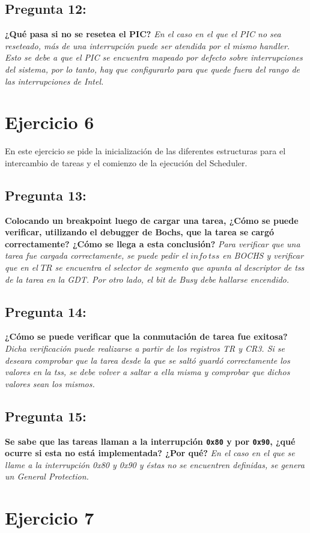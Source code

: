 \documentclass[10pt, a4paper]{article}
\begin{document}
{\subsection{Pregunta 12:}} \textbf{¿Qué pasa si no se resetea el PIC?}\newline
\newline
\textit{En el caso en el que el PIC no sea reseteado, más de una interrupción puede ser atendida por el mismo handler. Esto se debe a que el PIC se encuentra mapeado por defecto sobre interrupciones del sistema, por lo tanto, hay que configurarlo para que quede fuera del rango de las interrupciones de Intel.}

\section{Ejercicio 6}
En este ejercicio se pide la inicialización de las diferentes estructuras para el intercambio de tareas y el comienzo de la ejecución del Scheduler.


{\subsection{Pregunta 13:}} \textbf{Colocando un breakpoint luego de cargar una tarea, ¿Cómo se puede verificar, utilizando el debugger de Bochs, que la tarea se cargó correctamente?
¿Cómo se llega a esta conclusión?}\newline
\newline
\textit{Para verificar que una tarea fue cargada correctamente, se puede pedir el $info\ tss$ en BOCHS y verificar que en el $TR$ se encuentra el selector de segmento que apunta al descriptor de tss de la tarea en la GDT. Por otro lado, el bit de Busy debe hallarse encendido.}

{\subsection{Pregunta 14:}} \textbf{¿Cómo se puede verificar que la conmutación de tarea fue exitosa?}\newline
\newline
\textit{Dicha verificación puede realizarse a partir de los registros TR y CR3. Si se deseara comprobar que la tarea desde la que se saltó guardó correctamente los valores en la tss, se debe volver a saltar a ella misma y comprobar que dichos valores sean los mismos.}


{\subsection{Pregunta 15:}} \textbf{Se sabe que las tareas llaman a la interrupción \texttt{0x80} y por \texttt{0x90}, ¿qué ocurre si esta no está implementada? ¿Por qué?}\newline
\newline
\textit{En el caso en el que se llame a la interrupción 0x80 y 0x90 y éstas no se encuentren definidas, se genera un General Protection.}

\section{Ejercicio 7}
\end{document}
